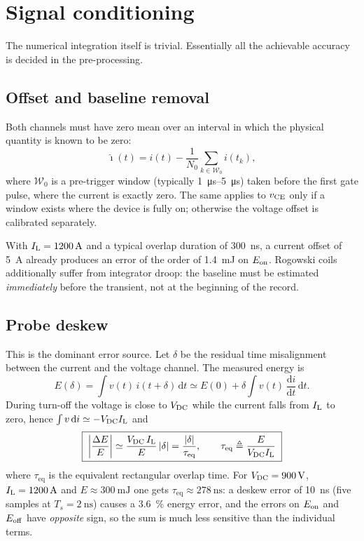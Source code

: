 \section{Signal conditioning}

The numerical integration itself is trivial. Essentially all the achievable accuracy is
decided in the pre-processing.

\subsection{Offset and baseline removal}

Both channels must have zero mean over an interval in which the physical quantity is
known to be zero:
\begin{equation}
\hat{\imath}(t) = i(t) - \frac{1}{N_0}\sum_{k\in\mathcal{W}_0} i(t_k),
\end{equation}
where $\mathcal{W}_0$ is a pre-trigger window (typically \SIrange{1}{5}{\micro\second})
taken before the first gate pulse, where the current is exactly zero. The same applies to
$v_{\mathrm{CE}}$ only if a window exists where the device is fully on; otherwise the voltage offset
is calibrated separately.

With $I_{\mathrm{L}}=\SI{1200}{\ampere}$ and a typical overlap duration of \SI{300}{\nano\second}, a
current offset of \SI{5}{\ampere} already produces an error of the order of
\SI{1.4}{\milli\joule} on $E_{\mathrm{on}}$. Rogowski coils additionally suffer from integrator
droop: the baseline must be estimated \emph{immediately} before the transient, not at the
beginning of the record.

\subsection{Probe deskew}

This is the dominant error source. Let $\delta$ be the residual time misalignment between
the current and the voltage channel. The measured energy is
\begin{equation}
E(\delta)=\int v(t)\, i(t+\delta)\,\mathrm{d}t
\simeq E(0)+\delta\int v(t)\,\frac{\mathrm{d}i}{\mathrm{d}t}\,\mathrm{d}t .
\end{equation}
During turn-off the voltage is close to $V_{\mathrm{DC}}$ while the current falls from $I_{\mathrm{L}}$ to
zero, hence $\int v\,\mathrm{d}i \simeq -V_{\mathrm{DC}} I_{\mathrm{L}}$ and
\begin{equation}
\boxed{\;\left|\frac{\Delta E}{E}\right| \simeq \frac{V_{\mathrm{DC}}\,I_{\mathrm{L}}}{E}\,|\delta|
= \frac{|\delta|}{\tau_{\mathrm{eq}}},\qquad
\tau_{\mathrm{eq}}\triangleq\frac{E}{V_{\mathrm{DC}} I_{\mathrm{L}}}\;}
\label{dpt:eq:deskew}
\end{equation}
where $\tau_{\mathrm{eq}}$ is the equivalent rectangular overlap time. For
$V_{\mathrm{DC}}=\SI{900}{\volt}$, $I_{\mathrm{L}}=\SI{1200}{\ampere}$ and $E\approx\SI{300}{\milli\joule}$ one
gets $\tau_{\mathrm{eq}}\approx\SI{278}{\nano\second}$: a deskew error of
\SI{10}{\nano\second} (five samples at $T_s=\SI{2}{\nano\second}$) causes a
\SI{3.6}{\percent} energy error, and the errors on $E_{\mathrm{on}}$ and $E_{\mathrm{off}}$ have
\emph{opposite} sign, so the sum is much less sensitive than the individual terms.

